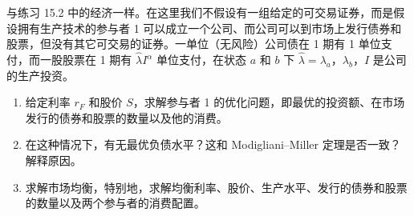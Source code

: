 \begin{problem}
 与练习 15.2 中的经济一样。在这里我们不假设有一组给定的可交易证券，而是假设拥有生产技术的参与者 1 可以成立一个公司、而公司可以到市场上发行债券和股票，但没有其它可交易的证券。一单位（无风险）公司债在 1 期有 1 单位支付，而一股股票在 1 期有 $\hat{\lambda}I^{\alpha}$ 单位支付，在状态 $a$ 和 $b$ 下 $\hat{\lambda}=\lambda_{a}$，$\lambda_{b}$，$I$ 是公司的生产投资。
\begin{enumerate}[label=(\alph*)]
    \item 给定利率 $r_{F}$ 和股价 $S$，求解参与者 1 的优化问题，即最优的投资额、在市场发行的债券和股票的数量以及他的消费。
    \item 在这种情况下，有无最优负债水平？这和 Modigliani--Miller 定理是否一致？解释原因。
    \item 求解市场均衡，特别地，求解均衡利率、股价、生产水平、发行的债券和股票的数量以及两个参与者的消费配置。
\end{enumerate}
\end{problem}
